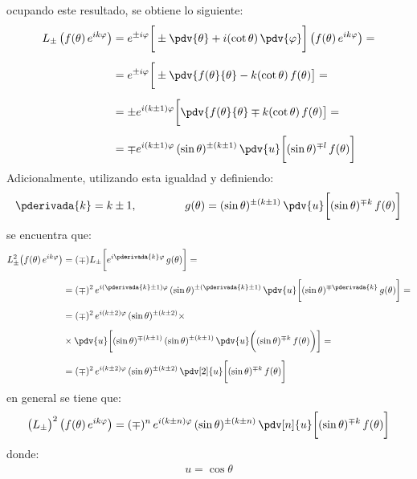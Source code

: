 ocupando este resultado, se obtiene lo siguiente:
\begin{align*}
L_{\pm} \, \big( f(\theta) \, e^{i k \varphi} \big) &= e^{\pm i \varphi} \bigg[ \pm \pdv{\theta} + i (\cot \theta) \, \pdv{\varphi} \bigg] \, \big( f(\theta) \, e^{i k \varphi} \big) = \\[0.5em]
&= e^{\pm i \varphi} \bigg[ \pm \pdv{f(\theta}{\theta} - k (\cot \theta) \, f(\theta) \big] = \\[0.5em]
&= \pm e^{i (k \pm 1) \varphi} \bigg[ \pdv{f(\theta}{\theta} \mp k (\cot \theta) \, f(\theta) \big] = \\[0.5em]
&= \mp e^{i (k \pm 1) \varphi} \, (\sin \theta)^{\pm (k \pm 1)} \, \pdv{u} \bigg[ (\sin \theta)^{\mp l} \, f(\theta) \bigg]
\end{align*}
Adicionalmente, utilizando esta igualdad y definiendo:
\begin{align*}
\pderivada{k} = k \pm 1, \hspace{1.5cm} g(\theta) = (\sin \theta)^{\pm (k \pm 1)} \, \pdv{u} \bigg[ (\sin \theta)^{\mp k} \, f(\theta) \bigg]
\end{align*}
se encuentra que:
\begin{align*}
L_{\pm}^{2} \big( f(\theta) \, e^{i k \varphi} \big) &= (\mp) L_{\pm} \bigg[ e^{i \pderivada{k} \varphi} \, g(\theta) \bigg] = \\[0.5em]
&= (\mp)^{2} \, e^{i (\pderivada{k} \pm 1) \varphi} \, (\sin \theta)^{\pm (\pderivada{k} \pm 1)} \, \pdv{u} \bigg[ (\sin \theta)^{\mp \pderivada{k}} \, g(\theta) \bigg] = \\[0.5em]
&= (\mp)^{2} \, e^{i (k \pm 2) \varphi} \, (\sin \theta)^{\pm (k \pm 2)} \times \\[0.5em]
&\times \pdv{u} \bigg[ (\sin \theta)^{\mp (k \pm 1)} \, (\sin \theta)^{\pm (k \pm 1)} \, \pdv{u} \bigg( (\sin \theta)^{\mp k} \, f(\theta) \bigg) \bigg] = \\[0.5em]
&= (\mp)^{2} \, e^{i (k \pm 2) \varphi} \, (\sin \theta)^{\pm (k \pm 2)} \, \pdv[2]{u} \bigg[ (\sin \theta)^{\mp k} \, f(\theta) \bigg]
\end{align*}
en general se tiene que:
\begin{align}
\big( L_{\pm} \big)^{2} \, \big( f(\theta) \, e^{i k \varphi} \big) = (\mp)^{n} \, e^{i (k \pm n) \varphi} \, (\sin \theta)^{\pm (k \pm n)} \, \pdv[n]{u} \bigg[ (\sin \theta)^{\mp k} \, f(\theta) \bigg]
\label{eq:ecuacion_10_160}
\end{align}
donde:
\begin{align*}
u = \cos \theta
\end{align*}

